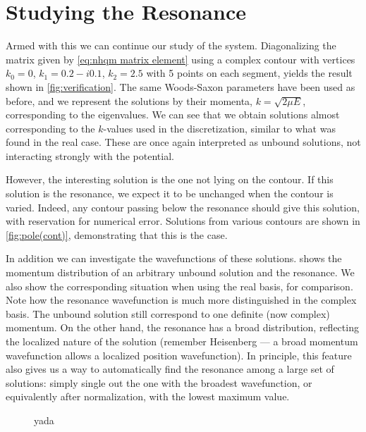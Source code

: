 \documentclass[../main/report.tex]{subfiles}
\begin{document}
\section{Studying the Resonance}
Armed with this we can continue our study of the  system. 
Diagonalizing the matrix given by \cref{eq:nhqm matrix element} using a complex contour with vertices $k_0 = 0$, $k_1 = 0.2 - i0.1$, $k_2 = 2.5$ 
with 5 points on each segment, yields the result shown in \cref{fig:verification}.
The same Woods-Saxon parameters have been used as before, and we represent the solutions by their momenta, $k=\sqrt{2\mu E}$, corresponding to the eigenvalues. 
We can see that we obtain solutions almost corresponding to the $k$-values used in the discretization, similar to what was found in the real case. 
These are once again interpreted as unbound solutions, not interacting strongly with the potential. 

However, the interesting solution is the one not lying on the contour. If this solution is the resonance, we expect it to be unchanged when the contour is varied. 
Indeed, any contour passing below the resonance should give this solution, with reservation for numerical error. 
Solutions from various contours are shown in \cref{fig:pole(cont)}, demonstrating that this is the case.

In addition we can investigate the wavefunctions of these solutions. 
 shows the momentum distribution of an arbitrary unbound solution and the resonance. We also show the corresponding situation when using the real basis, for comparison. Note how the resonance wavefunction is much more distinguished in the complex basis.  
The unbound solution still correspond to one definite (now complex) momentum. 
On the other hand, the resonance has a broad distribution, reflecting the localized nature of the solution 
(remember Heisenberg --- a broad momentum wavefunction allows a localized position wavefunction). 
In principle, this feature also gives us a way to automatically find the resonance among a large set of solutions: 
simply single out the one with the broadest wavefunction, or equivalently after normalization, with the lowest maximum value.


\begin{figure}[H]
\caption{yada} 
\label{fig:he5_eigvecs}
\end{figure}
\end{document}
